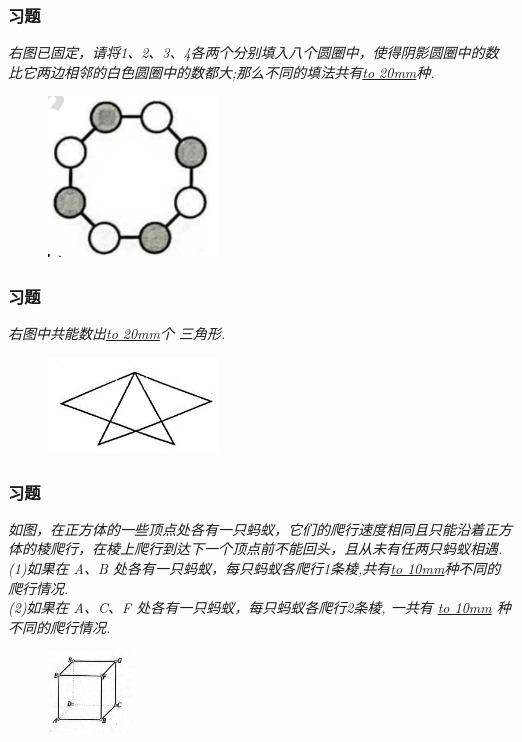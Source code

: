 \begin{frame}
    \frametitle{习题\theframecounter}
    \textit{右图已固定，请将1、2、3、4各两个分别填入八个圆圈中，使得阴影圆圈中的数比它两边相邻的白色圆圈中的数都大;那么不同的填法共有\underline{\hbox to 20mm{}}种.}
    \begin{figure}[H] 
        \centering
        \includegraphics[width=0.4\textwidth]{./pics/Chapter_6/6.png}
    \end{figure}
\end{frame}

\begin{frame}
    \frametitle{习题\theframecounter}
    \vspace*{-1cm}
    \textit{右图中共能数出\underline{\hbox to 20mm{}}个 三角形.}
    \begin{figure}[H] 
        \centering
        \includegraphics[width=0.4\textwidth]{./pics/Chapter_6/7.png}
    \end{figure}
\end{frame}


\begin{frame}
    \frametitle{习题\theframecounter}
    \textit{如图，在正方体的一些顶点处各有一只蚂蚁，它们的爬行速度相同且只能沿着正方体的棱爬行，在棱上爬行到达下一个顶点前不能回头，且从未有任两只蚂蚁相遇.\\
    (1)如果在 A、B 处各有一只蚂蚁，每只蚂蚁各爬行1条棱,共有\underline{\hbox to 10mm{}}种不同的爬行情况.\\
    (2)如果在 A、C、F 处各有一只蚂蚁，每只蚂蚁各爬行2条棱, 
    一共有 \underline{\hbox to 10mm{}} 种不同的爬行情况.
    }
    \begin{figure}[H] 
        \centering
        \includegraphics[width=0.2\textwidth]{./pics/Chapter_6/22.png}
    \end{figure}
\end{frame}


